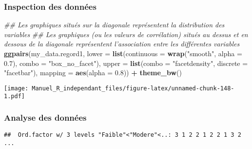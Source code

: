 \documentclass[
]{book}
\newenvironment{Shaded}{\begin{snugshade}}{\end{snugshade}}
\newcommand{\CommentTok}[1]{\textcolor[rgb]{0.56,0.35,0.01}{\textit{#1}}}
\newcommand{\DataTypeTok}[1]{\textcolor[rgb]{0.13,0.29,0.53}{#1}}
\newcommand{\FloatTok}[1]{\textcolor[rgb]{0.00,0.00,0.81}{#1}}
\newcommand{\KeywordTok}[1]{\textcolor[rgb]{0.13,0.29,0.53}{\textbf{#1}}}
\newcommand{\NormalTok}[1]{#1}
\newcommand{\OperatorTok}[1]{\textcolor[rgb]{0.81,0.36,0.00}{\textbf{#1}}}
\newcommand{\StringTok}[1]{\textcolor[rgb]{0.31,0.60,0.02}{#1}}
\begin{document}
\hypertarget{inspection-des-donnuxe9es-16}{%
\subsubsection{Inspection des données}\label{inspection-des-donnuxe9es-16}}

\begin{Shaded}
\begin{Highlighting}[]
\CommentTok{## Les graphiques situés sur la diagonale représentent la distribution des variables}
\CommentTok{## Les graphiques (ou les valeurs de corrélation) situés au dessus et en dessous de la diagonale représentent l'association entre les différentes variables}
\KeywordTok{ggpairs}\NormalTok{(my_data.regord1,}
        \DataTypeTok{lower =} \KeywordTok{list}\NormalTok{(}\DataTypeTok{continuous =} \KeywordTok{wrap}\NormalTok{(}\StringTok{"smooth"}\NormalTok{, }\DataTypeTok{alpha =} \FloatTok{0.7}\NormalTok{), }\DataTypeTok{combo =} \StringTok{"box_no_facet"}\NormalTok{),}
        \DataTypeTok{upper =} \KeywordTok{list}\NormalTok{(}\DataTypeTok{combo =} \StringTok{"facetdensity"}\NormalTok{, }\DataTypeTok{discrete =} \StringTok{"facetbar"}\NormalTok{), }
        \DataTypeTok{mapping =} \KeywordTok{aes}\NormalTok{(}\DataTypeTok{alpha =} \FloatTok{0.8}\NormalTok{)) }\OperatorTok{+}\StringTok{ }\KeywordTok{theme_bw}\NormalTok{()}
\end{Highlighting}
\end{Shaded}

\texttt{[image: Manuel\_R\_independant\_files/figure-latex/unnamed-chunk-148-1.pdf]}

\hypertarget{analyse-des-donnuxe9es-17}{%
\subsubsection{Analyse des données}\label{analyse-des-donnuxe9es-17}}

\begin{Shaded}
\end{Shaded}

\begin{verbatim}
##  Ord.factor w/ 3 levels "Faible"<"Modere"<..: 3 1 2 2 1 2 2 1 3 2 ...
\end{verbatim}
\end{document}
